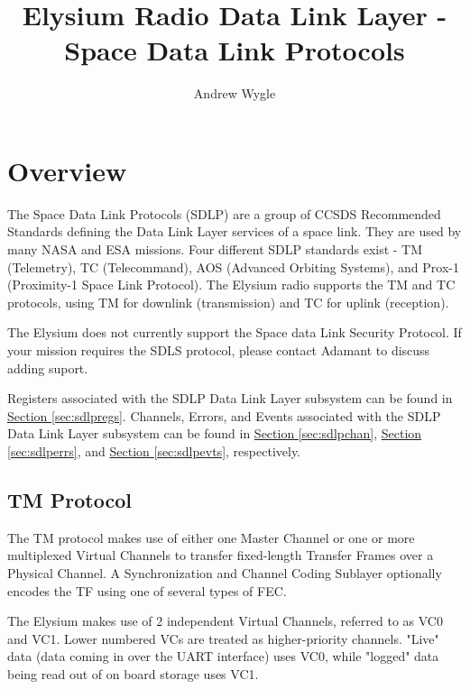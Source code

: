 \documentclass{hitec}
\author{Andrew Wygle}
\title{Elysium Radio Data Link Layer - Space Data Link Protocols}
\begin{document}

\maketitle

\tableofcontents
\listoffigures
\listoftables

\section{Overview}
\label{ch:overview}

The Space Data Link Protocols (SDLP) are a group of CCSDS Recommended Standards
defining the Data Link Layer services of a space link. They are used by many
NASA and ESA missions. Four different SDLP standards exist - TM (Telemetry), TC
(Telecommand), AOS (Advanced Orbiting Systems), and Prox-1 (Proximity-1 Space
Link Protocol). The Elysium radio supports the TM and TC protocols, using TM
for downlink (transmission) and TC for uplink (reception).

The Elysium does not currently support the Space data Link Security Protocol.
If your mission requires the SDLS protocol, please contact Adamant to discuss
adding suport.

Registers associated with the SDLP Data Link Layer subsystem can be found in
\hyperref[sec:sdlpregs]{Section \ref{sec:sdlpregs}}. Channels, Errors, and
Events associated with the SDLP Data Link Layer subsystem can be found in
\hyperref[sec:sdlpchan]{Section \ref{sec:sdlpchan}},
\hyperref[sec:sdlperrs]{Section \ref{sec:sdlperrs}}, and
\hyperref[sec:sdlpevts]{Section \ref{sec:sdlpevts}}, respectively.


\subsection{TM Protocol}

The TM protocol makes use of either one Master Channel or one or more
multiplexed Virtual Channels to transfer fixed-length Transfer Frames over a
Physical Channel. A Synchronization and Channel Coding Sublayer optionally
encodes the TF using one of several types of FEC. 

The Elysium makes use of 2 independent Virtual Channels, referred to as VC0 and
VC1. Lower numbered VCs are treated as higher-priority channels. "Live" data
(data coming in over the UART interface) uses VC0, while "logged" data being
read out of on board storage uses VC1.
\end{document}
